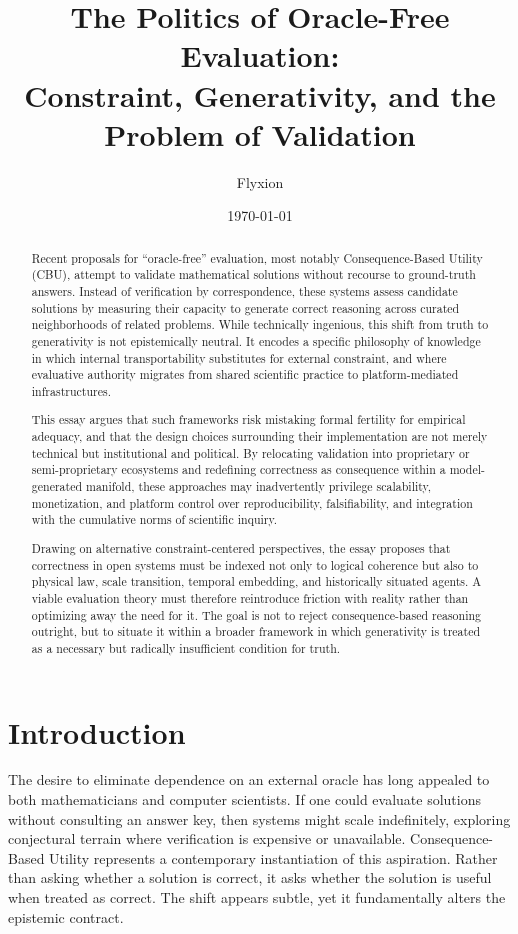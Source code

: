 \documentclass[12pt]{article}
\title{The Politics of Oracle-Free Evaluation:\\
Constraint, Generativity, and the Problem of Validation}
\author{Flyxion}
\date{\today}
\begin{document}
\maketitle

\begin{abstract}

Recent proposals for ``oracle-free'' evaluation, most notably Consequence-Based Utility (CBU), attempt to validate mathematical solutions without recourse to ground-truth answers. Instead of verification by correspondence, these systems assess candidate solutions by measuring their capacity to generate correct reasoning across curated neighborhoods of related problems. While technically ingenious, this shift from truth to generativity is not epistemically neutral. It encodes a specific philosophy of knowledge in which internal transportability substitutes for external constraint, and where evaluative authority migrates from shared scientific practice to platform-mediated infrastructures.

This essay argues that such frameworks risk mistaking formal fertility for empirical adequacy, and that the design choices surrounding their implementation are not merely technical but institutional and political. By relocating validation into proprietary or semi-proprietary ecosystems and redefining correctness as consequence within a model-generated manifold, these approaches may inadvertently privilege scalability, monetization, and platform control over reproducibility, falsifiability, and integration with the cumulative norms of scientific inquiry.

Drawing on alternative constraint-centered perspectives, the essay proposes that correctness in open systems must be indexed not only to logical coherence but also to physical law, scale transition, temporal embedding, and historically situated agents. A viable evaluation theory must therefore reintroduce friction with reality rather than optimizing away the need for it. The goal is not to reject consequence-based reasoning outright, but to situate it within a broader framework in which generativity is treated as a necessary but radically insufficient condition for truth.

\end{abstract}

\section{Introduction}

The desire to eliminate dependence on an external oracle has long appealed to both mathematicians and computer scientists. If one could evaluate solutions without consulting an answer key, then systems might scale indefinitely, exploring conjectural terrain where verification is expensive or unavailable. Consequence-Based Utility represents a contemporary instantiation of this aspiration. Rather than asking whether a solution is correct, it asks whether the solution is useful when treated as correct. The shift appears subtle, yet it fundamentally alters the epistemic contract.
\end{document}
